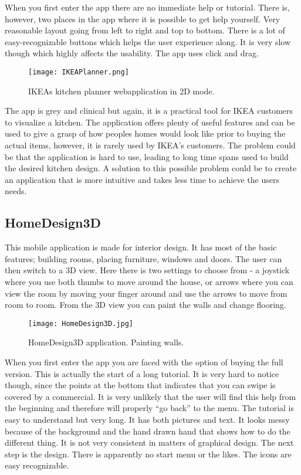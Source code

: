 When you first enter the app there are no immediate help or tutorial. There is, however, two places in the app where it is possible to get help yourself. Very reasonable layout going from left to right and top to bottom.  There is a lot of easy-recognizable buttons which helps the user experience along. 
It is very slow though which highly affects the usability. The app uses click and drag.

\begin{figure}[H]
\centering
\texttt{[image: IKEAPlanner.png]}
\caption{IKEAs kitchen planner webapplication in 2D mode.}
\end{figure}

The app is grey and clinical but again, it is a practical tool for IKEA customers to visualize a kitchen. 
The application offers plenty of useful features and can be used to give a grasp of how peoples homes would look like prior to buying the actual items, however, it is rarely used by IKEA's customers. The problem could be that the application is hard to use, leading to long time spans used to build the desired kitchen design. A solution to this possible problem could be to create an application that is more intuitive and takes less time to achieve the users needs.

\subsection{HomeDesign3D}
This mobile application is made for interior design. It has most of the basic features; building rooms, placing furniture, windows and doors. The user can then switch to a 3D view. Here there is two settings to choose from - a joystick where you use both thumbs to move around the house, or arrows where you can view the room by moving your finger around and use the arrows to move from room to room. From the 3D view you can paint the walls and change flooring.

\begin{figure}[H]
\centering
\texttt{[image: HomeDesign3D.jpg]}
\caption{HomeDesign3D application. Painting walls.}
\end{figure}

When you first enter the app you are faced with the option of buying the full version. This is actually the start of a long tutorial. It is very hard to notice though, since the points at the bottom that indicates that you can swipe is covered by a commercial. It is very unlikely that the user will find this help from the beginning and therefore will properly “go back” to the menu. The tutorial is easy to understand but very long. It has both pictures and text. It looks messy because of the background and the hand drawn hand that shows how to do the different thing. It is not very consistent in matters of graphical design. 
The next step is the design. There is apparently no start menu or the likes. 
The icons are easy recognizable.  


